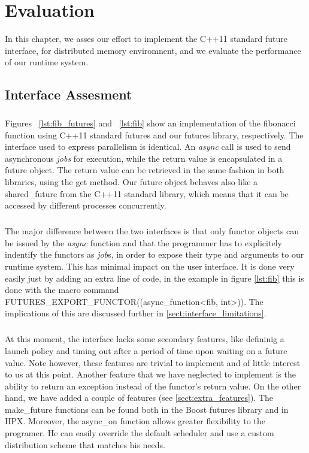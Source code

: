 \chapter{Evaluation}
\label{chapter:evaluation}
	In this chapter, we asses our effort to implement the C++11 standard future interface, for 
distributed memory enviromnent, and we evaluate the performance of our runtime system.

\section{Interface Assesment}
\label{sect:interface_assesment}

\paragraph{}
Figures ~\ref{lst:fib_futures} and ~\ref{lst:fib} show an implementation of the fibonacci function using
C++11 standard futures and our futures library, respectively.  The interface used to express parallelism is
identical.  An \emph{async} call is used to send asynchronous \emph{jobs} for execution, while the return value
is encapsulated in a future object.  The return value can be retrieved in the same fashion in both libraries, 
using the get method.  Our future object behaves also like a shared\_future from the C++11 standard library,
which means that it can be accessed by different processes concurrently.  

\paragraph{}
The major difference between the two interfaces is that only functor objects can be 
issued by the \emph{async} function and that the programmer has to explicitely indentify the functors
as \emph{job}s, in order to expose their type and arguments to our runtime system.  This has minimal impact on
the user interface.  It is done very easily just by adding an extra line of code, in the example in figure 
\ref{lst:fib} this is done with 
the macro command FUTURES\_EXPORT\_FUNCTOR((async\_function<fib, int>)).  The implications of this are discussed
further in \ref{sect:interface_limitations}.  

\paragraph{}
At this moment, the interface lacks some secondary features, like defininig a launch policy and timing out
after a period of time upon waiting on a future value.  Note however, these features are trivial to implement
and of little interest to us at this point.  Another feature that we have neglected to implement is the 
ability to return an exception instead of the functor's return value.  On the other hand, we have added a couple
of features (see \ref{sect:extra_features}).  The make\_future functions can be found both in the Boost futures
library and in HPX.  Moreover, the async\_on function allows greater flexibility to the programer.  He can 
easily override the default scheduler and use a custom distribution scheme that matches his needs.  

